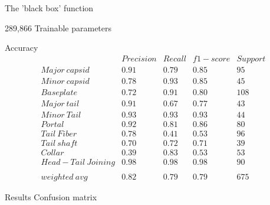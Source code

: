 \documentclass{beamer}
\begin{document}
\begin{frame}{The 'black box' function}
 \\
\begin{center}
289,866 Trainable parameters
\end{center}
\end{frame}

\begin{frame}{Accuracy}
$$
\begin{matrix}
 & Precision & Recall & f1-score & Support\\ 
Major\ capsid & 0.91 & 0.79 & 0.85 & 95\\ 
Minor\ capsid & 0.78 & 0.93 & 0.85 & 45\\ 
Baseplate & 0.72 & 0.91 & 0.80 & 108\\ 
Major\ tail & 0.91 & 0.67 & 0.77 & 43\\ 
Minor\ Tail & 0.93 & 0.93 & 0.93 & 44\\ 
Portal & 0.92 & 0.81 & 0.86 & 80\\ 
Tail\ Fiber & 0.78 & 0.41 & 0.53 & 96\\  
Tail\ shaft & 0.70 & 0.72 & 0.71 & 39\\ 
Collar & 0.39 & 0.83 & 0.53 & 53\\ 
Head-Tail\ Joining & 0.98 & 0.98 & 0.98 & 90\\ 
 &  &  &  & \\ 
weighted\ avg & 0.82 & 0.79 & 0.79 & 675 
\end{matrix}
$$
\end{frame}



\begin{frame}{Results Confusion matrix}
\end{frame}
\end{document}
